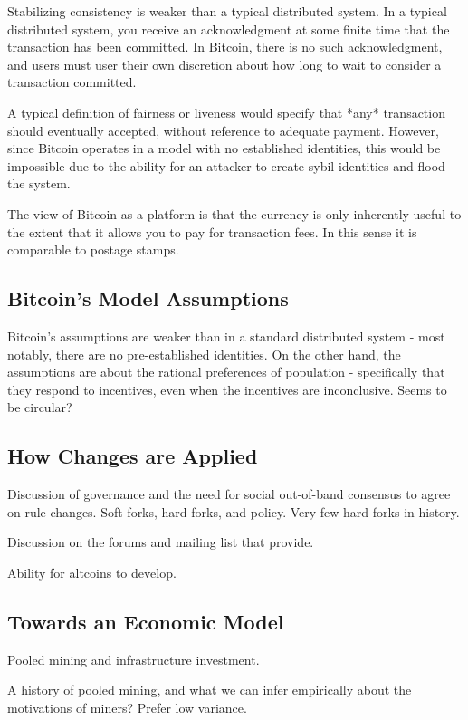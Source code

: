 Stabilizing consistency is weaker than a typical distributed system. In a typical distributed system, you receive an acknowledgment at some finite time that the transaction has been committed. In Bitcoin, there is no such acknowledgment, and users must user their own discretion about how long to wait to consider a transaction committed.

A typical definition of fairness or liveness would specify that *any* transaction should eventually accepted, without reference to adequate payment. However, since Bitcoin operates in a model with no established identities, this would be impossible due to the ability for an attacker to create sybil identities and flood the system.

The view of Bitcoin as a platform is that the currency is only inherently useful to the extent that it allows you to pay for transaction fees. In this sense it is comparable to postage stamps.


\subsection{Bitcoin's Model Assumptions}

Bitcoin's assumptions are weaker than in a standard distributed system - most notably, there are no pre-established identities. On the other hand, the assumptions are about the rational preferences of population - specifically that they respond to incentives, even when the incentives are inconclusive. Seems to be circular?


\subsection{How Changes are Applied}

Discussion of governance and the need for social out-of-band consensus to agree on rule changes. Soft forks, hard forks, and policy. Very few hard forks in history.

Discussion on the forums and mailing list that provide.

Ability for altcoins to develop.


\subsection{Towards an Economic Model}

Pooled mining and infrastructure investment.

A history of pooled mining, and what we can infer empirically about the motivations of miners? Prefer low variance.
